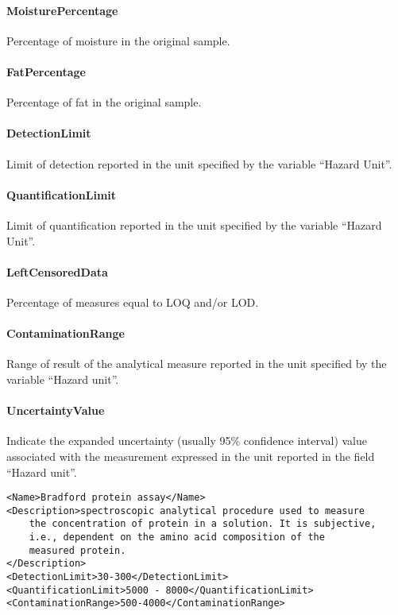 \documentclass[a4paper]{report}
\begin{document}
\paragraph{MoisturePercentage}
Percentage of moisture in the original sample.

\paragraph{FatPercentage}
Percentage of fat in the original sample.

\paragraph{DetectionLimit}
Limit of detection reported in the unit specified by the variable ``Hazard Unit''.

\paragraph{QuantificationLimit}
Limit of quantification reported in the unit specified by the variable ``Hazard Unit''.

\paragraph{LeftCensoredData}
Percentage of measures equal to LOQ and/or LOD.

\paragraph{ContaminationRange}
Range of result of the analytical measure reported in the unit specified by the variable ``Hazard unit''.

\paragraph{UncertaintyValue}
Indicate the expanded uncertainty (usually 95\% confidence interval) value associated with the measurement expressed in the unit reported in the field ``Hazard unit''.

\begin{lstlisting}[caption={Example of Assay}, language=RAKIP]
<Name>Bradford protein assay</Name>
<Description>spectroscopic analytical procedure used to measure
    the concentration of protein in a solution. It is subjective,
    i.e., dependent on the amino acid composition of the
    measured protein.
</Description>
<DetectionLimit>30-300</DetectionLimit>
<QuantificationLimit>5000 - 8000</QuantificationLimit>
<ContaminationRange>500-4000</ContaminationRange>
\end{lstlisting}
\end{document}
